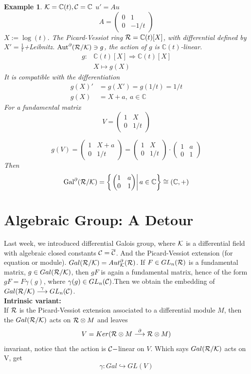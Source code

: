 \documentclass[11pt]{article}
\newtheorem{ex}[thm]{Example}
\newcommand{\pd}{\partial}
\newcommand{\cplx}{\mathbb C}
\newcommand{\calc}{{\cal C}}
\newcommand{\calk}{{\cal K}}
\newcommand{\calr}{{\cal R}}
\newcommand{\Lrta}{\Longrightarrow}
\newcommand{\lrta}{\longrightarrow}
\newcommand{\inj}{\hookrightarrow}
\begin{document}
\begin{ex}
$\calk=\cplx(t),\calc=\cplx$
$u'=Au$
$$
A=\begin{pmatrix}
0 & 1\\
0 & -1/t
\end{pmatrix}
$$
$X:=\log(t)$. The Picard-Vessiot ring $\calr=\cplx(t)[X]$, with differential defined by $X'=\frac{1}{t}$+Leibnitz.
$\text{Aut}^\pd(\calr/\calk)\ni g$, the action of $g$ is $\cplx(t)$-linear.
$$
\begin{aligned}
g:&\cplx(t)[X]\Lrta \cplx(t)[X]\\
& X\longmapsto g(X)
\end{aligned}
$$
It is compatible with the differentiation
$$
\begin{aligned}
g(X)'&=g(X')=g(1/t)=1/t\\
g(X)&=X+a,\ a\in\cplx
\end{aligned}
$$
For a fundamental matrix
$$
V=
\begin{pmatrix*}
1 & X\\
0 & 1/t
\end{pmatrix*}
$$

$$
g(V)=
\begin{pmatrix*}
1 & X+a\\
0 & 1/t
\end{pmatrix*}
=\begin{pmatrix*}
1 & X\\
0 & 1/t
\end{pmatrix*}
\cdot 
\begin{pmatrix*}
1 & a\\
0 & 1
\end{pmatrix*}
$$
Then 
$$
\text{Gal}^\pd(\calr/\calk)
=\left\{\left.\begin{pmatrix*}
1 & a\\
0 & 1
\end{pmatrix*}
\right| a\in \cplx
\right\}
\cong(\cplx,+)
$$
\end{ex}

\section{Algebraic Group: A Detour}
Last week, we introduced differential Galois group, where $\calk$ is a differential field with algebraic closed constants $\calc=\overline{\calc}$. And the Picard-Vessiot extension (for equation or module). $Gal(\calr/\calk)=Aut^\pd_\calk(\calr)$. If $F\in GL_n(\calr)$ is a fundamental matrix, $g\in Gal(\calr/\calk)$, then $gF $ is again a fundamental matrix, hence of the form $g F= F\gamma(g)$, where $\gamma(g)\in GL_n(\calc)$.Then we obtain the embedding of $Gal(\calr/\calk)\overset{\gamma}{\lrta}GL_n(\calc)$.\\
\textbf{Intrinsic variant:}\\
 If $\calr$ is the Picard-Vessiot extension associated to a differential module $M$, then the $Gal(\calr/\calk)$ acts on $\calr\otimes M$ and leaves 
$$
V=Ker(\calr\otimes M\overset{\pd}{\lrta}\calr\otimes M)
$$
invariant, notice that the action is $\calc-$linear on $V$. Which says $Gal(\calr/\calk)$ acts on V, get 
$$
\gamma:Gal\inj GL(V)
$$
\end{document}
